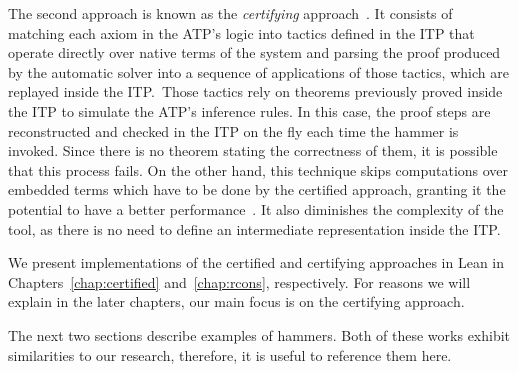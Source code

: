 The second approach is known as the \textit{certifying} approach~\cite{snipe}. It consists of matching
each axiom in the ATP's logic into tactics
defined in the ITP that operate directly over native terms of the system and parsing
the proof produced by the automatic solver into a sequence of applications
of those tactics, which are replayed inside the ITP.\
Those tactics rely on theorems previously proved inside the ITP to simulate the ATP's inference rules.
In this case, the proof steps are reconstructed and checked in the ITP on the
fly each time the hammer is invoked. Since there is no theorem stating the
correctness of them, it is possible that this process fails.
On the other hand,
this technique skips computations over embedded terms which have to be done by the
certified approach, granting it the potential to have a better
performance~\cite{ringLean}. It also diminishes the complexity of the tool, as there is no need to
define an intermediate representation inside the ITP.\

We present implementations of the certified and certifying approaches in Lean
in Chapters~\ref{chap:certified} and~\ref{chap:rcons}, respectively. For reasons
we will explain in the later chapters, our main focus is on the certifying approach.

The next two sections describe examples of hammers.
Both of these works exhibit similarities to our research, therefore, it is useful to reference them here.
